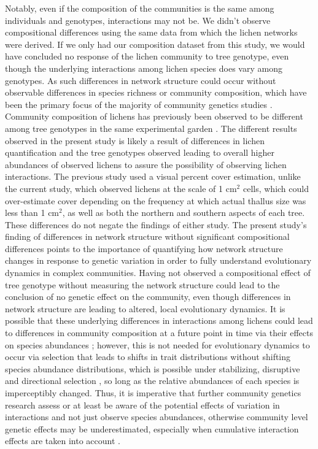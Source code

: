 \documentclass[fleqn,12pt]{olplainarticle}
\begin{document}
Notably, even if the composition of the communities is the same among
individuals and genotypes, interactions may not be. We didn't observe
compositional differences using the same data from which the lichen
networks were derived. If we only had our composition dataset from
this study, we would have concluded no response of the lichen
community to tree genotype, even though the underlying interactions
among lichen species does vary among genotypes. As such differences in
network structure could occur without observable differences in
species richness or community composition, which have been the primary
focus of the majority of community genetics studies
\citep{Whitham2020IntraspecificEvolution}. Community composition
of lichens has previously been observed to be different among tree
genotypes in the same experimental garden \citep{Lamit2011,
  Lamit2015a}. The different results observed in the present study is
likely a result of differences in lichen quantification and the tree
genotypes observed leading to overall higher abundances of observed
lichens to assure the possibility of observing lichen
interactions. The previous study used a visual percent cover
estimation, unlike the current study, which observed lichens at the
scale of 1 cm$^2$ cells, which could over-estimate cover depending on
the frequency at which actual thallus size was less than 1 cm$^2$, as
well as both the northern and southern aspects of each tree. These
differences do not negate the findings of either study. The present
study's finding of differences in network structure without
significant compositional differences points to the importance of
quantifying how network structure changes in response to genetic
variation in order to fully understand evolutionary dynamics in
complex communities. Having not observed a compositional effect of
tree genotype without measuring the network structure could lead to
the conclusion of no genetic effect on the community, even though
differences in network structure are leading to altered, local
evolutionary dynamics. It is possible that these underlying
differences in interactions among lichens could lead to differences in
community composition at a future point in time via their effects on
species abundances \citep{Shuster2006COMMUNITYSTRUCTURE}; however,
this is not needed for evolutionary dynamics to occur via selection
that leads to shifts in trait distributions without shifting species
abundance distributions, which is possible under stabilizing,
disruptive and directional selection \citep{Conner2004ATextbook}, so
long as the relative abundances of each species is imperceptibly
changed. Thus, it is imperative that further community genetics
research assess or at least be aware of the potential effects of
variation in interactions and not just observe species abundances,
otherwise community level genetic effects may be underestimated,
especially when cumulative interaction effects are taken into account
\citep{Borrett2007FunctionalProliferation, Borrett2010}.
\end{document}
